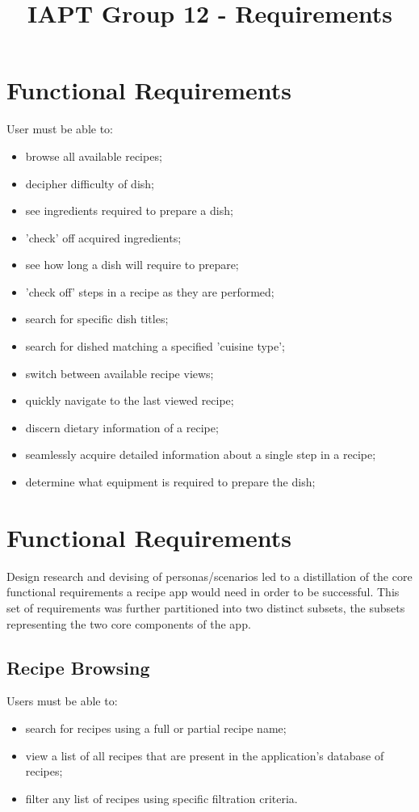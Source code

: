 \documentclass{article}
\title{IAPT Group 12 - Requirements}
\begin{document}
\section{Functional Requirements}
User must be able to:
\begin{itemize}
\item browse all available recipes;
\item decipher difficulty of dish;
\item see ingredients required to prepare a dish;
\item 'check' off acquired ingredients;
\item see how long a dish will require to prepare;
\item 'check off' steps in a recipe as they are performed;
\item search for specific dish titles;
\item search for dished matching a specified 'cuisine type';
\item switch between available recipe views;
\item quickly navigate to the last viewed recipe;
\item discern dietary information of a recipe;
\item seamlessly acquire detailed information about a single step in a recipe;
\item determine what equipment is required to prepare the dish;
\end{itemize}

\section{Functional Requirements}
Design research and devising of personas/scenarios led to a distillation of the core functional requirements a recipe app would need in order to be successful. This set of requirements was further partitioned into two distinct subsets, the subsets representing the two core components of the app.

\subsection{Recipe Browsing}
Users must be able to:
\begin{itemize}
\item search for recipes using a full or partial recipe name;
\item view a list of all recipes that are present in the application's database of recipes;
\item filter any list of recipes using specific filtration criteria.
\end{itemize}
\end{document}
